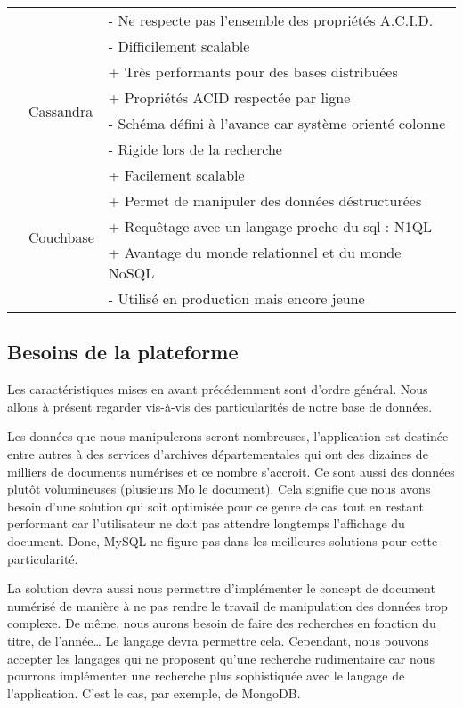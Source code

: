 \begin{center}
\begin{tabular}{|l|l|l|}
            & & - Ne respecte pas l’ensemble des propriétés A.C.I.D. \\
            & & - Difficilement scalable \\ \cline{2-3}
            & \multirow{4}{*}{Cassandra} & + Très performants pour des bases distribuées \\
            & & + Propriétés ACID respectée par ligne \\
            & & - Schéma défini à l’avance car système orienté colonne \\
            & & - Rigide lors de la recherche \\ \cline{2-3}
            & \multirow{6}{*}{Couchbase} & + Facilement scalable \\
            & & + Permet de manipuler des données déstructurées \\
            & & + Requêtage avec un langage proche du sql : N1QL \\
            & & + Avantage du monde relationnel et du monde NoSQL \\
            & & - Utilisé en production mais encore jeune \\
            \hline
        \end{tabular}
        \end{center}

    \subsection{Besoins de la plateforme}
    \label{subsec:besoinplateforme}
    Les caractéristiques mises en avant précédemment sont d’ordre général. Nous allons à présent
    regarder vis-à-vis des particularités de notre base de données.

    Les données que nous manipulerons seront nombreuses, l’application est destinée entre autres
    à des services d’archives départementales qui ont des dizaines de milliers de documents numérises
    et ce nombre s’accroit. Ce sont aussi des données plutôt volumineuses (plusieurs Mo le document).
    Cela signifie que nous avons besoin d’une solution qui soit optimisée pour ce genre de cas tout
    en restant performant car l’utilisateur ne doit pas attendre longtemps l’affichage du document.
    Donc, MySQL ne figure pas dans les meilleures solutions pour cette particularité.

    La solution devra aussi nous permettre d’implémenter le concept de document numérisé de manière
    à ne pas rendre le travail de manipulation des données trop complexe. De même, nous aurons besoin
    de faire des recherches en fonction du titre, de l’année… Le langage devra permettre cela.
    Cependant, nous pouvons accepter les langages qui ne proposent qu’une recherche rudimentaire
    car nous pourrons implémenter une recherche plus sophistiquée avec le langage de l’application.
    C’est le cas, par exemple, de MongoDB.

